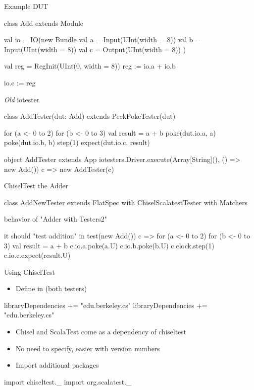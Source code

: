 \begin{frame}[fragile]{Example DUT}
\begin{chisel}
class Add extends Module {
  val io = IO(new Bundle {
    val a = Input(UInt(width = 8))
    val b = Input(UInt(width = 8))
    val c = Output(UInt(width = 8))
  })

  val reg = RegInit(UInt(0, width = 8))
  reg := io.a + io.b

  io.c := reg
}
\end{chisel}
\end{frame}

\begin{frame}[fragile]{\emph{Old} iotester}
\begin{chisel}
class AddTester(dut: Add) extends PeekPokeTester(dut) {

  for (a <- 0 to 2) {
    for (b <- 0 to 3) {
      val result = a + b
      poke(dut.io.a, a)
      poke(dut.io.b, b)
      step(1)
      expect(dut.io.c, result)
    }
  }
}

object AddTester extends App {
  iotesters.Driver.execute(Array[String](), () => new Add()) { c => new AddTester(c) }
}
\end{chisel}
\end{frame}

\begin{frame}[fragile]{ChiselTest the Adder}
\begin{chisel}
class AddNewTester extends FlatSpec with ChiselScalatestTester with Matchers {
  behavior of "Adder with Testers2"

  it should "test addition" in {
    test(new Add()) { c =>
      for (a <- 0 to 2) {
        for (b <- 0 to 3) {
          val result = a + b
          c.io.a.poke(a.U)
          c.io.b.poke(b.U)
          c.clock.step(1)
          c.io.c.expect(result.U)
        }
      }
    }
  }
}
\end{chisel}
\end{frame}


\begin{frame}[fragile]{Using ChiselTest}
\begin{itemize}
\item Define in  (both testers)
\end{itemize}
\begin{chisel}
libraryDependencies += "edu.berkeley.cs" %
libraryDependencies += "edu.berkeley.cs" %
\end{chisel}
\begin{itemize}
\item Chisel and ScalaTest come as a dependency of chiseltest
\item No need to specify, easier with version numbers
\item Import additional packages
\end{itemize}
\begin{chisel}
import chiseltest._
import org.scalatest._
\end{chisel}
\end{frame}

